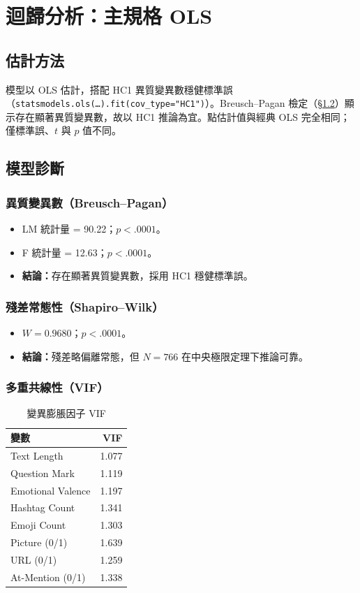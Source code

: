 \documentclass[12pt,a4paper]{ctexart}
\begin{document}
\newpage

\section{迴歸分析：主規格 OLS}

\subsection{估計方法}

模型以 OLS 估計，搭配 HC1 異質變異數穩健標準誤（\texttt{statsmodels.ols(\ldots).fit(cov\_type="HC1")}）。Breusch--Pagan 檢定（§\ref{sec:diag}）顯示存在顯著異質變異數，故以 HC1 推論為宜。點估計值與經典 OLS 完全相同；僅標準誤、$t$ 與 $p$ 值不同。

\subsection{模型診斷}
\label{sec:diag}

\subsubsection{異質變異數（Breusch--Pagan）}
\begin{itemize}
    \item LM 統計量 = 90.22；$p<.0001$。
    \item F 統計量 = 12.63；$p<.0001$。
    \item \textbf{結論：}存在顯著異質變異數，採用 HC1 穩健標準誤。
\end{itemize}

\subsubsection{殘差常態性（Shapiro--Wilk）}
\begin{itemize}
    \item $W = 0.9680$；$p<.0001$。
    \item \textbf{結論：}殘差略偏離常態，但 $N=766$ 在中央極限定理下推論可靠。
\end{itemize}

\subsubsection{多重共線性（VIF）}

\begin{table}[H]
\centering
\caption{變異膨脹因子 VIF}
\small
\begin{tabular}{lr}
\toprule
變數 & VIF \\
\midrule
Text Length & 1.077 \\
Question Mark & 1.119 \\
Emotional Valence & 1.197 \\
Hashtag Count & 1.341 \\
Emoji Count & 1.303 \\
Picture (0/1) & 1.639 \\
URL (0/1) & 1.259 \\
At-Mention (0/1) & 1.338 \\
\bottomrule
\end{tabular}
\end{table}
\end{document}
